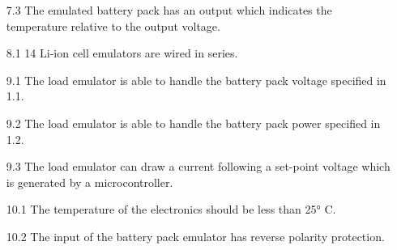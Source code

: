 \begin{enumerate}
    \item[7.3] The emulated battery pack has an output which indicates the
    temperature relative to the output voltage.
    \item[8.1] 14 Li-ion cell emulators are wired in series. 
    \item[9.1] The load emulator is able to handle the battery pack voltage
    specified in 1.1.
    \item[9.2] The load emulator is able to handle the battery pack power
    specified in 1.2.
    \item[9.3] The load emulator can draw a current following a set-point 
    voltage which is generated by a microcontroller.
    \item[10.1] The temperature of the electronics should be less than 25° C.
    \item[10.2] The input of the battery pack emulator has reverse polarity
    protection.
\end{enumerate}